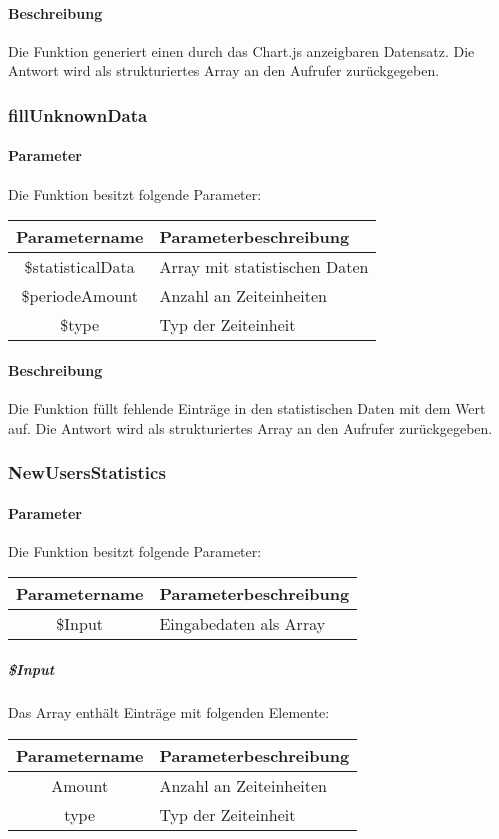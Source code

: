\paragraph{Beschreibung} Die Funktion generiert einen durch das Chart.js anzeigbaren Datensatz. Die Antwort wird als strukturiertes Array an den Aufrufer zurückgegeben.
\subsubsection{fillUnknownData}
\paragraph{Parameter} Die Funktion besitzt folgende Parameter:
\begin{table}[H]
	\begin{tabular}{|c|p{11cm}|}
		\hline
		\textbf{Parametername} & \textbf{Parameterbeschreibung} \\ \hline
		\$statisticalData & Array mit statistischen Daten \\ \hline
		\$periodeAmount   & Anzahl an Zeiteinheiten \\ \hline
		\$type            & Typ der Zeiteinheit \\ \hline
	\end{tabular}
\end{table}
\paragraph{Beschreibung} Die Funktion füllt fehlende Einträge in den statistischen Daten mit dem Wert {\grqq} auf. Die Antwort wird als strukturiertes Array an den Aufrufer zurückgegeben.
\subsubsection{NewUsersStatistics}
\paragraph{Parameter} Die Funktion besitzt folgende Parameter:
\begin{table}[H]
	\begin{tabular}{|c|p{11cm}|}
		\hline
		\textbf{Parametername} & \textbf{Parameterbeschreibung} \\ \hline
		\$Input & Eingabedaten als Array \\ \hline
	\end{tabular}
\end{table}
\subparagraph{\$Input}Das Array enthält Einträge mit folgenden Elemente:
\begin{table}[H]
	\begin{tabular}{|c|p{11cm}|}
		\hline
		\textbf{Parametername} & \textbf{Parameterbeschreibung} \\ \hline
		Amount & Anzahl an Zeiteinheiten \\ \hline
		type   & Typ der Zeiteinheit \\ \hline
	\end{tabular}
\end{table}
